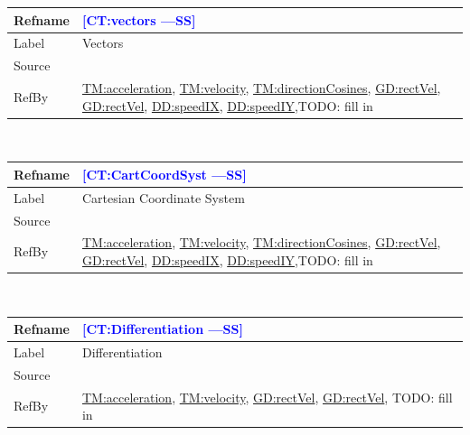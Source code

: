 \documentclass[12pt]{article}
\newcommand{\authornote}[3]{\textcolor{#1}{[#3 ---#2]}}
\newcommand{\authornote}[3]{}
\newcommand{\wss}[1]{\authornote{blue}{SS}{#1}}
\begin{document}
\medskip
\noindent
\begin{minipage}{\textwidth}
\begin{tabular}{>{\raggedright}p{}>{\raggedright\arraybackslash}p{}}
\toprule \textbf{Refname} & \textbf{\wss{CT:vectors}}
\label{CT:vectors}
\\ \midrule
Label & Vectors
\\ \midrule
Source & \cite{}
\\ \midrule
RefBy & \hyperref[TM:acceleration]{TM:acceleration},
\hyperref[TM:velocity]{TM:velocity},
\hyperref[TM:directionCosines]{TM:directionCosines},
\hyperref[GD:rectVel]{GD:rectVel}, \hyperref[GD:rectVel]{GD:rectVel}, \hyperref[DD:speedIX]{DD:speedIX}, \hyperref[DD:speedIY]{DD:speedIY},TODO: fill in
\\ \bottomrule
\end{tabular}
\end{minipage}
~\\

\medskip
\noindent
\begin{minipage}{\textwidth}
\begin{tabular}{>{\raggedright}p{}>{\raggedright\arraybackslash}p{}}
\toprule \textbf{Refname} & \textbf{\wss{CT:CartCoordSyst}}
\label{CT:CartCoordSyst}
\\ \midrule
Label & Cartesian Coordinate System
\\ \midrule
Source & \cite{}
\\ \midrule
RefBy & \hyperref[TM:acceleration]{TM:acceleration},
\hyperref[TM:velocity]{TM:velocity},
\hyperref[TM:directionCosines]{TM:directionCosines},
\hyperref[GD:rectVel]{GD:rectVel}, \hyperref[GD:rectVel]{GD:rectVel}, \hyperref[DD:speedIX]{DD:speedIX}, \hyperref[DD:speedIY]{DD:speedIY},TODO: fill in
\\ \bottomrule
\end{tabular}
\end{minipage}
~\\

\medskip
\noindent
\begin{minipage}{\textwidth}
\begin{tabular}{>{\raggedright}p{}>{\raggedright\arraybackslash}p{}}
\toprule \textbf{Refname} & \textbf{\wss{CT:Differentiation}}
\label{CT:Differentiation}
\\ \midrule
Label & Differentiation
\\ \midrule
Source & \cite{}
\\ \midrule
RefBy & \hyperref[TM:acceleration]{TM:acceleration},
\hyperref[TM:velocity]{TM:velocity}, \hyperref[GD:rectVel]{GD:rectVel}, \hyperref[GD:rectVel]{GD:rectVel}, TODO:
fill in 
\\ \bottomrule
\end{tabular}
\end{minipage}
~\\
\end{document}
